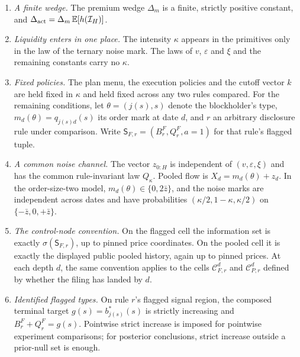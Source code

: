 \begin{enumerate}[label=(S\arabic*),leftmargin=3.0em,itemsep=2pt]
  $\pi(\mathcal I) = \Prb(a = 1 \mid \mathcal I)$ takes values in $[0,1]$ and the bidder-entry
  probability $p(\mathcal I)$ takes values in $(0,1)$ and is a continuous function of the posterior
  and the price. The pricing rule pins one version of $\Eop[Y \mid \mathcal I]$ rather than an
  equivalence class.
\item \label{p:wedge} \emph{A finite wedge.} The premium wedge $\Delta_m$ is a finite, strictly
  positive constant, and $\Delta_{\mathrm{act}} = \Delta_m\,\mathbb{E}[h(\mathcal I_H)]$.
\item \label{p:kappa} \emph{Liquidity enters in one place.} The intensity $\kappa$ appears in the
  primitives only in the law of the ternary noise mark. The laws of $v$, $\varepsilon$ and $\xi$
  and the remaining constants carry no $\kappa$.
\item \label{p:fixed} \emph{Fixed policies.} The plan menu, the execution policies and the cutoff
  vector $k$ are held fixed in $\kappa$ and held fixed across any two rules compared.
For the remaining conditions, let $\theta=(j(s),s)$ denote the blockholder's type,
$m_d(\theta)=q_{j(s)d}(s)$ its order mark at date $d$, and $r$ an arbitrary disclosure rule under
comparison. Write $\mathsf S_{F,r}=(B_r^F,Q_r^F,a{=}1)$ for that rule's flagged tuple.
\item \label{p:noise} \emph{A common noise channel.} The vector $z_{0:H}$ is independent of
  $(v,\varepsilon,\xi)$ and has the common rule-invariant law $Q_\kappa$. Pooled flow is
  $X_d=m_d(\theta)+z_d$. In the order-size-two model,
  $m_d(\theta)\in\{0,2\bar z\}$, and the noise marks are independent across dates and have
  probabilities $(\kappa/2,1-\kappa,\kappa/2)$ on
  $\{-\bar z,0,+\bar z\}$.
\item \label{p:control} \emph{The control-node convention.} On the flagged cell the information set
  is exactly $\sigma(\mathsf S_{F,r})$, up to pinned price coordinates. On the pooled cell it is
  exactly the displayed public pooled history, again up to pinned prices. At each depth $d$, the
  same convention applies to the cells $\mathcal C_{F,r}^d$ and $\mathcal C_{P,r}^d$ defined by
  whether the filing has landed by $d$.
\item \label{p:decoder} \emph{Identified flagged types.} On rule $r$'s flagged signal region, the
  composed terminal target $g(s)=b^*_{j(s)}(s)$ is strictly increasing and
  $B^F_r+Q^F_r=g(s)$. Pointwise strict increase is imposed for pointwise experiment comparisons;
  for posterior conclusions, strict increase outside a prior-null set is enough.
\end{enumerate}


